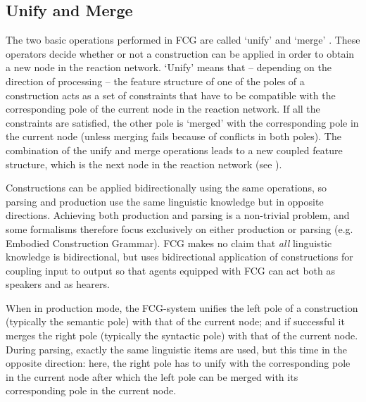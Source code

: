 \vspace{0.3cm}
\subsection{Unify and Merge} 
The two basic operations performed in FCG are called `unify' and `merge' \citep[not to be confused with `merge' in Minimalism]{steels06unify}. These operators decide whether or not a construction can be applied in order to obtain a new node in the reaction network. `Unify' means that -- depending on the direction of processing -- the feature structure of one of the poles of a construction acts as a set of constraints that have to be compatible with the corresponding pole of the current node in the reaction network. If all the constraints are satisfied, the other pole is `merged' with the corresponding pole in the current node (unless merging fails because of conflicts in both poles). The combination of the unify and merge operations leads to a new coupled feature structure, which is the next node in the reaction network (see ).

Constructions can be applied bidirectionally using the same operations, so parsing and production use the same linguistic knowledge but in opposite directions. Achieving both production and parsing is a non-trivial problem, and some formalisms therefore focus exclusively on either production or parsing (e.g. Embodied Construction Grammar). FCG makes no claim that {\em all} linguistic knowledge is bidirectional, but uses bidirectional application of constructions for coupling input to output so that agents equipped with FCG can act both as speakers and as hearers. 

When in production mode, the FCG-system unifies the left pole of a construction (typically the semantic pole) with that of the current node; and if successful it merges the right pole (typically the syntactic pole) with that of the current node. During parsing, exactly the same linguistic items are used, but this time in the opposite direction: here, the right pole has to unify with the corresponding pole in the current node after which the left pole can be merged with its corresponding pole in the current node.

